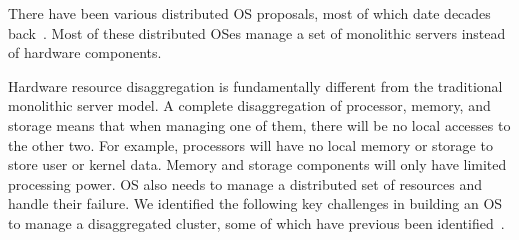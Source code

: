 \documentclass[10pt,times,twocolumn]{z2-article}
\begin{document}
There have been various distributed OS proposals,
most of which date decades back~\cite{Amoeba-Experience,Sprite,MOSIX}. %
Most of these distributed OSes manage a set of monolithic servers
instead of hardware components.

Hardware resource disaggregation is fundamentally different from the traditional monolithic server model.
A complete disaggregation of processor, memory, and storage 
means that when managing one of them, there will be no local accesses to the other two.
For example, processors will have no local memory or storage to store user or kernel data.
Memory and storage components will only have limited processing power. %
OS also needs to manage a distributed set of resources and handle their failure.
We identified the following key challenges in building an OS to manage a disaggregated cluster,
some of which have previous been identified~\cite{HP-MemoryOS}.
\end{document}
